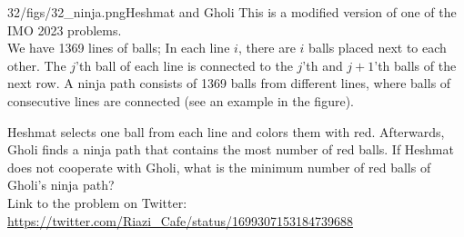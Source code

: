 \begin{problem}{32/figs/32_ninja.png}{Heshmat and Gholi}
This  is a modified version of one of the IMO 2023 problems.\\[0.2cm]

We have 1369 lines of balls; In each line $i$, there are $i$ balls placed next to each other. The $j$'th ball of each line is connected to the $j$'th and $j+1$'th balls of the next row. A ninja path consists of 1369 balls from different lines, where balls of consecutive lines are connected (see an example in the figure).

Heshmat selects one ball from each line and colors them with red. Afterwards, Gholi finds a ninja path that contains the most number of red balls. If Heshmat does not cooperate with Gholi, what is the minimum number of red balls of Gholi's ninja path?\\[0.2cm]

Link to the problem on Twitter:  \url{https://twitter.com/Riazi_Cafe/status/1699307153184739688}\end{problem}